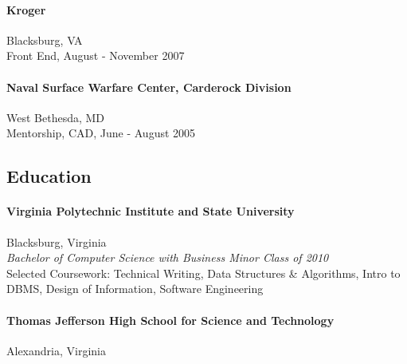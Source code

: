 \documentclass[10pt]{article}
\begin{document}
{
\paragraph*{Kroger}
Blacksburg, VA\\
Front End, August - November 2007
}{}

{
\paragraph*{Naval Surface Warfare Center, Carderock Division}
West Bethesda, MD\\
Mentorship, CAD, June - August 2005
}{}


\subsection*{Education}
\paragraph*{Virginia Polytechnic Institute and State University}\quad Blacksburg, Virginia\\
\textit{Bachelor of Computer Science with Business Minor \quad Class of 2010}\\
Selected Coursework: Technical Writing, Data Structures \& Algorithms, Intro to DBMS, Design of Information, Software Engineering
\paragraph*{Thomas Jefferson High School for Science and Technology}\quad Alexandria, Virginia
\end{document}
